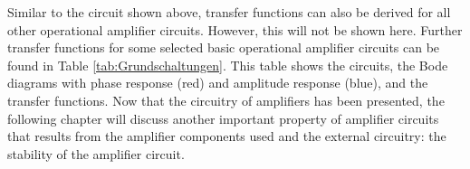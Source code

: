 \begin{frame}
{%
        \par
        Similar to the circuit shown above, transfer functions can also be derived for all other operational amplifier circuits. However, this will not be shown here.
        Further transfer functions for some selected basic operational amplifier circuits can be found in Table \ref{tab:Grundschaltungen}. 
        This table shows the circuits, the Bode diagrams with phase response (red) and amplitude response (blue), and the transfer functions.
        Now that the circuitry of amplifiers has been presented, the following chapter will discuss another important property of amplifier 
        circuits that results from the amplifier components used and the external circuitry: the stability of the amplifier circuit.        
}
\end{frame}
